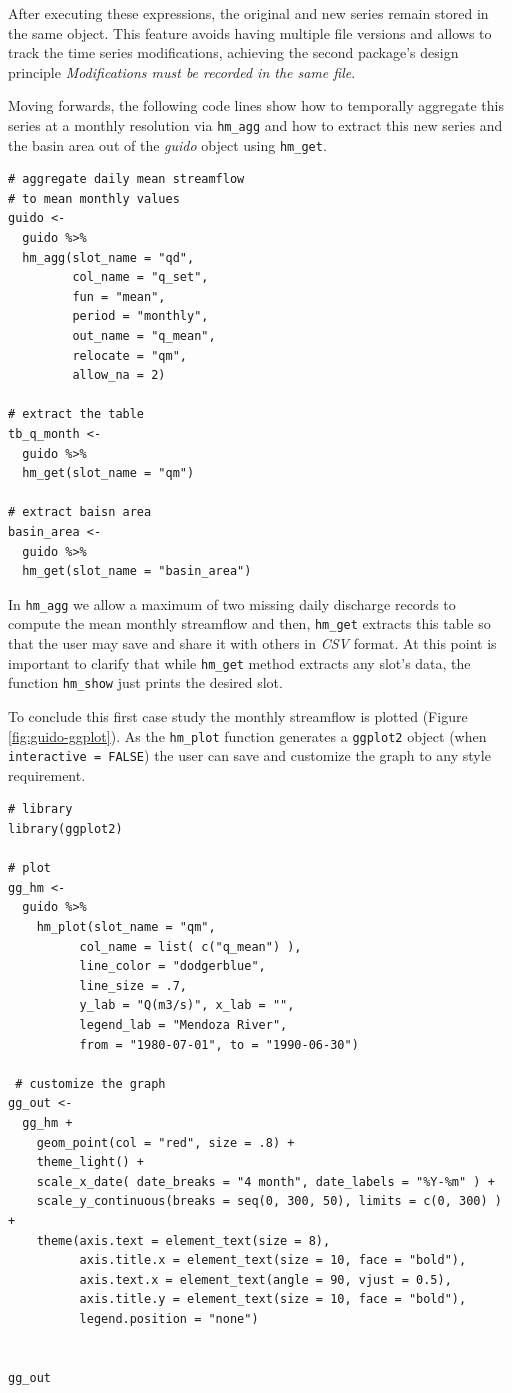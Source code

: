 \noindent
After executing these expressions, the original and new series remain
stored in the same object. This feature avoids having multiple file
versions and allows to track the time series modifications,
achieving the second package's design principle
\emph{Modifications must be recorded in the same file}.

Moving forwards, the following code lines show how to temporally
aggregate this series at a monthly resolution via \texttt{hm\_agg} and how
to extract this new series and the basin area out of the
\emph{guido} object using \texttt{hm\_get}.

\begin{verbatim}
# aggregate daily mean streamflow 
# to mean monthly values
guido <- 
  guido %>%
  hm_agg(slot_name = "qd",
         col_name = "q_set", 
         fun = "mean", 
         period = "monthly", 
         out_name = "q_mean", 
         relocate = "qm", 
         allow_na = 2)

# extract the table 
tb_q_month <- 
  guido %>% 
  hm_get(slot_name = "qm")

# extract baisn area
basin_area <- 
  guido %>% 
  hm_get(slot_name = "basin_area")
\end{verbatim}

\noindent
In \texttt{hm\_agg} we allow a maximum of two missing daily discharge records
to compute the mean monthly streamflow and then, \texttt{hm\_get} extracts this
table so that the user may save and share it with others in \emph{CSV} format.
At this point is important to clarify that while \texttt{hm\_get} method extracts
any slot's data, the function \texttt{hm\_show} just prints the desired slot.

To conclude this first case study the monthly streamflow is
plotted (Figure \ref{fig:guido-ggplot}). As the \texttt{hm\_plot}
function generates a \texttt{ggplot2} object (when \texttt{interactive\ =\ FALSE})
the user can save and customize the graph to any style requirement.

\begin{verbatim}
# library
library(ggplot2)

# plot
gg_hm <-
  guido %>%
    hm_plot(slot_name = "qm", 
          col_name = list( c("q_mean") ), 
          line_color = "dodgerblue",
          line_size = .7,
          y_lab = "Q(m3/s)", x_lab = "", 
          legend_lab = "Mendoza River", 
          from = "1980-07-01", to = "1990-06-30") 
  
 # customize the graph
gg_out <- 
  gg_hm + 
    geom_point(col = "red", size = .8) +
    theme_light() + 
    scale_x_date( date_breaks = "4 month", date_labels = "%Y-%m" ) +
    scale_y_continuous(breaks = seq(0, 300, 50), limits = c(0, 300) ) +
    theme(axis.text = element_text(size = 8),
          axis.title.x = element_text(size = 10, face = "bold"),
          axis.text.x = element_text(angle = 90, vjust = 0.5),
          axis.title.y = element_text(size = 10, face = "bold"), 
          legend.position = "none")
        

gg_out
\end{verbatim}

